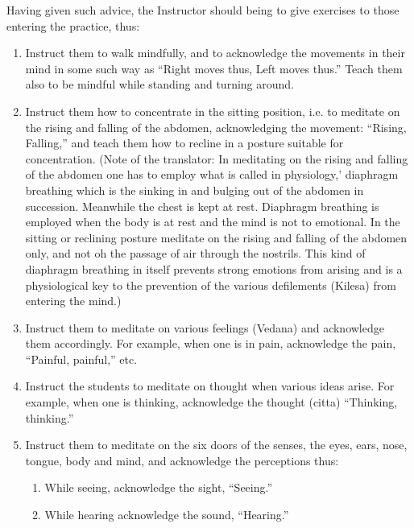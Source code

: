 \documentclass[a5paper,10pt,english]{book}
\begin{document}
\sphinxAtStartPar
Having given such advice, the Instructor should being to give exercises to those entering the practice, thus:
\begin{enumerate}
%
\item {} 
\sphinxAtStartPar
Instruct them to walk mindfully, and to acknowledge the movements in their mind in some such way as “Right moves thus, Left moves thus.” Teach them also to be mindful while standing and turning around.

\item {} 
\sphinxAtStartPar
Instruct them how to concentrate in the sitting position, i.e. to meditate on the rising and falling of the abdomen, acknowledging the movement: “Rising, Falling,” and teach them how to recline in a posture suitable for concentration. (Note of the translator: In meditating on the rising and falling of the abdomen one has to employ what is called in physiology,’ diaphragm breathing which is the sinking in and bulging out of the abdomen in succession. Meanwhile the chest is kept at rest. Diaphragm breathing is employed when the body is at rest and the mind is not to emotional. In the sitting or reclining posture meditate on the rising and falling of the abdomen only, and not oh the passage of air through the nostrils. This kind of diaphragm breathing in itself prevents strong emotions from arising and is a physiological key to the prevention of the various defilements (Kilesa) from entering the mind.)

\item {} 
\sphinxAtStartPar
Instruct them to meditate on various feelings (Vedana) and acknowledge them accordingly. For example, when one is in pain, acknowledge the pain, “Painful, painful,” etc.

\item {} 
\sphinxAtStartPar
Instruct the students to meditate on thought when various ideas arise. For example, when one is thinking, acknowledge the thought (citta) “Thinking, thinking.”

\item {} 
\sphinxAtStartPar
Instruct them to meditate on the six doors of the senses, the eyes, ears, nose, tongue, body and mind, and acknowledge the perceptions thus:
\begin{enumerate}
%
\item {} 
\sphinxAtStartPar
While seeing, acknowledge the sight, “Seeing.”

\item {} 
\sphinxAtStartPar
While hearing acknowledge the sound, “Hearing.”


\end{enumerate}
\end{enumerate}
\end{document}
